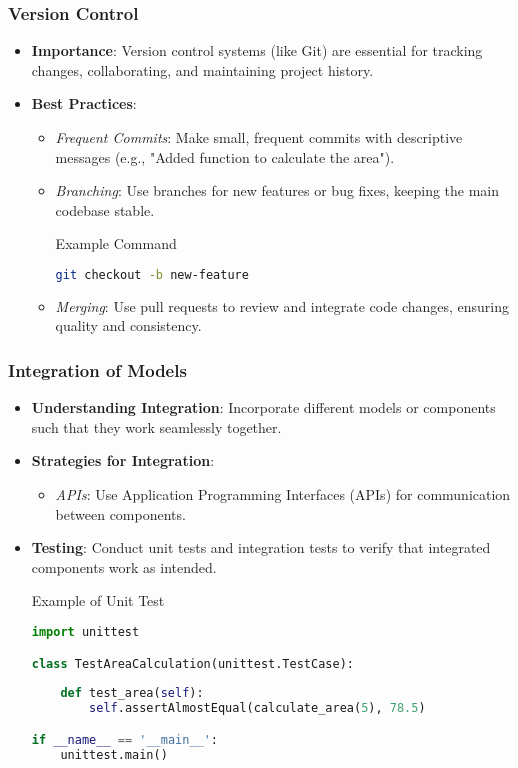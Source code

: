\documentclass[aspectratio=169]{beamer}
\begin{document}
\begin{frame}[fragile]
  \frametitle{Version Control}
  \begin{itemize}
    \item \textbf{Importance}: Version control systems (like Git) are essential for tracking changes, collaborating, and maintaining project history.
    
    \item \textbf{Best Practices}:
      \begin{itemize}
        \item \textit{Frequent Commits}: Make small, frequent commits with descriptive messages (e.g., "Added function to calculate the area").
        \item \textit{Branching}: Use branches for new features or bug fixes, keeping the main codebase stable.
        \begin{block}{Example Command}
          \begin{lstlisting}[language=bash]
git checkout -b new-feature
          \end{lstlisting}
        \end{block}
        \item \textit{Merging}: Use pull requests to review and integrate code changes, ensuring quality and consistency.
      \end{itemize}
  \end{itemize}
\end{frame}

\begin{frame}[fragile]
  \frametitle{Integration of Models}
  \begin{itemize}
    \item \textbf{Understanding Integration}: Incorporate different models or components such that they work seamlessly together.
    
    \item \textbf{Strategies for Integration}:
      \begin{itemize}
        \item \textit{APIs}: Use Application Programming Interfaces (APIs) for communication between components.
      \end{itemize}
    
    \item \textbf{Testing}: Conduct unit tests and integration tests to verify that integrated components work as intended.
    \begin{block}{Example of Unit Test}
      \begin{lstlisting}[language=Python]
import unittest

class TestAreaCalculation(unittest.TestCase):
    
    def test_area(self):
        self.assertAlmostEqual(calculate_area(5), 78.5)

if __name__ == '__main__':
    unittest.main()
      \end{lstlisting}
    \end{block}
  \end{itemize}
\end{frame}
\end{document}
